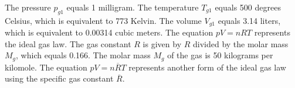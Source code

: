 The pressure \( p_{g1} \) equals 1 milligram.
The temperature \( T_{g1} \) equals 500 degrees Celsius, which is equivalent to 773 Kelvin.
The volume \( V_{g1} \) equals 3.14 liters, which is equivalent to 0.00314 cubic meters.
The equation \( pV = nRT \) represents the ideal gas law.
The gas constant \( R \) is given by \( R \) divided by the molar mass \( M_g \), which equals 0.166.
The molar mass \( M_g \) of the gas is 50 kilograms per kilomole.
The equation \( pV = n \overline{R} T \) represents another form of the ideal gas law using the specific gas constant \( \overline{R} \).